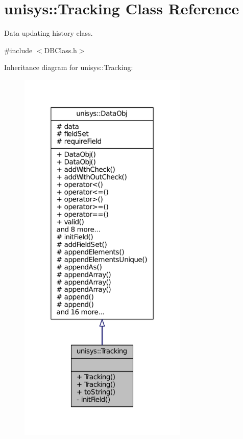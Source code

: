 \hypertarget{classunisys_1_1Tracking}{\section{unisys\-:\-:Tracking Class Reference}
\label{classunisys_1_1Tracking}
}


Data updating history class.  




{\ttfamily \#include $<$D\-B\-Class.\-h$>$}



Inheritance diagram for unisys\-:\-:Tracking\-:
\nopagebreak
\begin{figure}[H]
\begin{center}
\leavevmode
\includegraphics[width=228pt]{classunisys_1_1Tracking__inherit__graph}
\end{center}
\end{figure}


